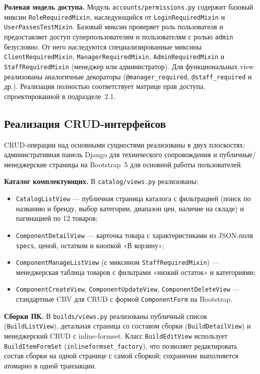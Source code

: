 \documentclass[14pt, a4paper]{extarticle}
\begin{document}
\textbf{Ролевая модель доступа.} Модуль \texttt{accounts/permissions.py} содержит базовый миксин \texttt{RoleRequiredMixin}, наследующийся от \texttt{LoginRequiredMixin} и \texttt{UserPassesTestMixin}. Базовый миксин проверяет роль пользователя и предоставляет доступ суперпользователям и пользователям с ролью \texttt{admin} безусловно. От него наследуются специализированные миксины \texttt{ClientRequiredMixin}, \texttt{ManagerRequiredMixin}, \texttt{AdminRequiredMixin} и \texttt{StaffRequiredMixin} (менеджер или администратор). Для функциональных view реализованы аналогичные декораторы (\texttt{@manager\_required}, \texttt{@staff\_required} и др.). Реализация полностью соответствует матрице прав доступа, спроектированной в подразделе~2.1.

\subsection{Реализация CRUD-интерфейсов}

CRUD-операции над основными сущностями реализованы в двух плоскостях: административная панель Django для технического сопровождения и публичные/менеджерские страницы на Bootstrap~5 для основной работы пользователей.

\textbf{Каталог комплектующих.} В \texttt{catalog/views.py} реализованы:
\begin{itemize}
    \item \texttt{CatalogListView} --- публичная страница каталога с фильтрацией (поиск по названию и бренду, выбор категории, диапазон цен, наличие на складе) и пагинацией по 12 товаров;
    \item \texttt{ComponentDetailView} --- карточка товара с характеристиками из JSON-поля \texttt{specs}, ценой, остатком и кнопкой «В корзину»;
    \item \texttt{ComponentManageListView} (с миксином \texttt{StaffRequiredMixin}) --- менеджерская таблица товаров с фильтрами «низкий остаток» и категориями;
    \item \texttt{ComponentCreateView}, \texttt{ComponentUpdateView}, \texttt{ComponentDeleteView} --- стандартные CBV для CRUD с формой \texttt{ComponentForm} на Bootstrap.
\end{itemize}

\textbf{Сборки ПК.} В \texttt{builds/views.py} реализованы публичный список (\texttt{BuildListView}), детальная страница со составом сборки (\texttt{BuildDetailView}) и менеджерский CRUD с inline-formset. Класс \texttt{BuildEditView} использует \texttt{BuildItemFormSet} (\texttt{inlineformset\_factory}), что позволяет редактировать состав сборки на одной странице с самой сборкой; сохранение выполняется атомарно в одной транзакции.
\end{document}
